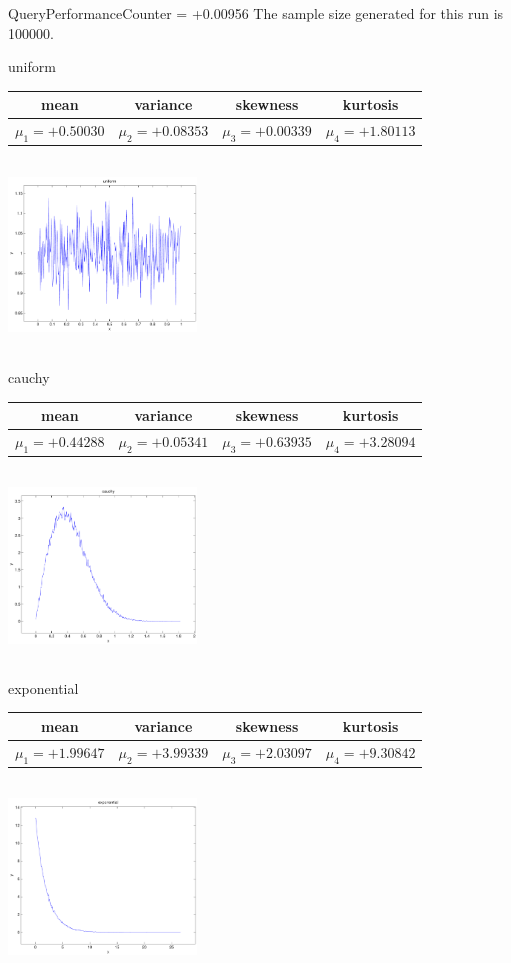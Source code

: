\documentclass[9pt]{article}
\theoremstyle{plain}
\theoremstyle{definition}
\theoremstyle{remark}
\numberwithin{equation}{section}
\begin{document}
QueryPerformanceCounter  =  +0.00956
The sample size generated for this run is 100000.

\newpage
uniform \begin{tabular}{|c|c|c|c|}  mean & variance & skewness & kurtosis \\  \hline
$\mu_1 = +0.50030$ & $\mu_2 = +0.08353$ & $\mu_3 = +0.00339$ & $\mu_4 =+1.80113$ \\
\end{tabular}

\includegraphics[width=5cm,height=5cm]{uniform.pdf}

cauchy \begin{tabular}{|c|c|c|c|}  mean & variance & skewness & kurtosis \\  \hline
$\mu_1 = +0.44288$ & $\mu_2 = +0.05341$ & $\mu_3 = +0.63935$ & $\mu_4 =+3.28094$ \\
\end{tabular}

\includegraphics[width=5cm,height=5cm]{cauchy.pdf}

exponential \begin{tabular}{|c|c|c|c|}  mean & variance & skewness & kurtosis \\  \hline
$\mu_1 = +1.99647$ & $\mu_2 = +3.99339$ & $\mu_3 = +2.03097$ & $\mu_4 =+9.30842$ \\
\end{tabular}

\includegraphics[width=5cm,height=5cm]{exponential.pdf}
\end{document}
